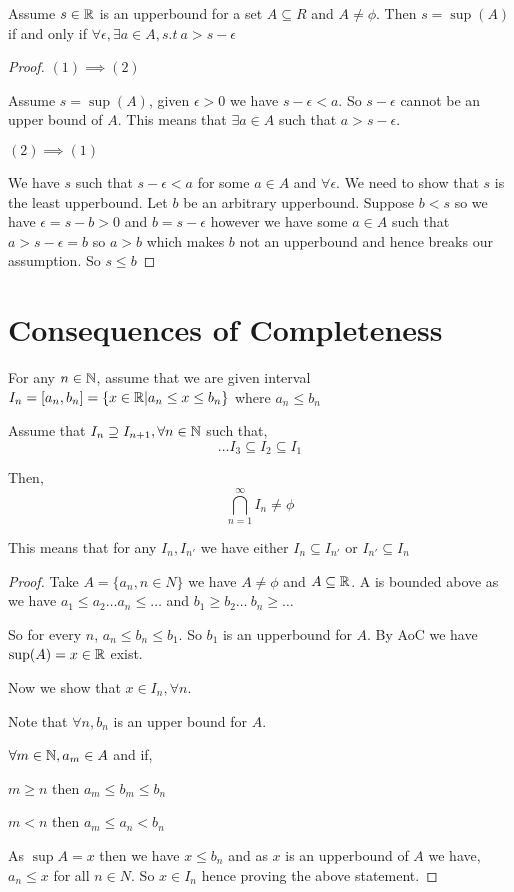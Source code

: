 \begin{lemma}
    Assume $s \in \mathbb{R}$ is an upperbound for a set  $A \subseteq R$ and  $A \ne \phi$. Then $s = \sup(A)$ if and only if  $\forall \epsilon, \exists a \in A, s.t \: a > s -\epsilon$
\end{lemma}
\begin{proof}
    $(1) \implies (2)$

    Assume  $s = \sup(A)$, given  $\epsilon > 0$ we have  $s - \epsilon < a$. So  $s - \epsilon$ cannot be an upper bound of  $A$. This means that $\exists a \in A$ such that  $a > s - \epsilon$.

     $(2) \implies (1)$

     We have $s$ such that $ s - \epsilon < a$ for some  $a \in A$ and $\forall \epsilon$. We need to show that $s$ is the least upperbound. Let $b$ be an arbitrary upperbound. Suppose $b < s$ so we have $\epsilon = s - b > 0$ and  $b = s - \epsilon$ however we have some $a \in A$ such that $a > s - \epsilon = b$ so  $a > b$ which makes $b$ not an upperbound and hence breaks our assumption. So $s \le b$
\end{proof}


\section{Consequences of Completeness}
\begin{theorem}
    For any $n \in \mathbb{N}$, assume that we are given interval  $I_n = [a_n, b_n] = \{x \in \mathbb{R} | a_n \le x \le b_n\}$  where $a_n \le b_n$

    Assume that  $I_n \supseteq I_{n + 1}, \forall n \in \mathbb{N}$ such that,
    $$ \dots I_3 \subseteq I_2 \subseteq I_1  $$ 

    Then, 
    $$ \bigcap_{n = 1}^{\infty} I_n \ne \phi $$ 
\end{theorem}
\begin{note}
    This means that for any $I_n, I_{n'}$ we have either  $I_n \subseteq I_{n'}$ or $I_{n'} \subseteq I_{n}$
\end{note}
\begin{proof}
    Take $A = \{a_n, n \in N\}$  we have  $A \ne \phi$ and  $A \subseteq \mathbb{R}$. A is bounded above as we have  $a_1 \le a_2 \dots a_n \le \dots$ and $b_1 \ge b_2 \dots \ b_n \ge \dots$

    So for every $n$, $a_n \le b_n \le b_1$. So $b_1$ is an upperbound for $A$. By AoC we have  $\sup(A) = x \in \mathbb{R}$ exist.

    Now we show that $x \in I_n, \forall n$.

    Note that  $\forall n, b_n $ is an upper bound for  $A$.

     $\forall m \in \mathbb{N}, a_m \in A$ and if,

     $m \ge n$ then  $a_m \le b_m \le b_n$  

     $m < n$ then  $a_m \le a_n < b_n$


     As $\sup A = x$ then we have  $x \le b_n$ and as  $x$ is an upperbound of $A$ we have, $a_n \le x$ for all  $n \in N$. So  $x \in I_n$ hence proving the above statement. 
\end{proof}

